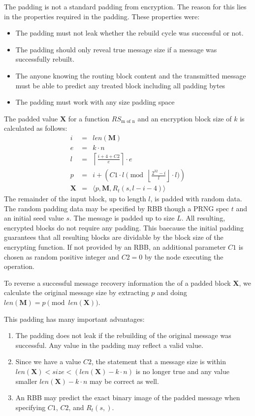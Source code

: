 \documentclass[10pt,journal,compsoc]{IEEEtran}
\begin{document}
The padding is not a standard padding from encryption. The reason for this lies in the properties required in the padding. These properties were:
\begin{itemize}
	\item The padding must not leak whether the rebuild cycle was successful or not.
	\item The padding should only reveal true message size if a message was successfully rebuilt. 
	\item The anyone knowing the routing block content and the transmitted message must be able to predict any treated block including all padding bytes
	\item The padding must work with any size padding space
\end{itemize}

The padded value $\mathbf{X}$ for a function $RS_{\text{m of n}}$ and an encryption block size of $k$ is calculated as follows:
\begin{eqnarray}
	i          & = & len(\mathbf{M})\\
	e          & = & k \cdot n\\
	l          & = & \left\lceil\frac{i + 4 + C2 }{e}\right\rceil\cdot e\\
	p          & = & i + \left( C1 \cdot l \pmod{\left\lfloor\frac{2^{32}-i}{l}\right\rfloor\cdot l}\right)\\
	\mathbf{X} & = & \langle p,\mathbf{M},R_{t}\left(s,l-i-4\right)\rangle
\end{eqnarray}	
The remainder of the input block, up to length $l$, is padded with random data. The random padding data may be specified by RBB though a PRNG spec $t$ and an initial seed value $s$. The message is padded up to size $L$. All resulting, encrypted blocks do not require any padding. This baecause the initial padding guarantees that all resulting blocks are dividable by the block size of the encrypting function. If not provided by an RBB, an additional parameter $C1$ is chosen as random positive integer and $C2=0$  by the node executing the operation.

To reverse a successful message recovery information the of a padded block $\mathbf{X}$, we calculate the original message size by extracting $p$ and doing $len(\mathbf{M})=p \pmod{ len(\mathbf{X})}$.

This padding has many important advantages:
\begin{enumerate}
	\item The padding does not leak if the rebuilding of the original message was successful. Any value in the padding may reflect a valid value.
	\item Since we have a value $C2$, the statement that a message size is within $len(\mathbf{X})<size<(len(\mathbf{X})-k\cdot n)$ is no longer true and any value smaller $len(\mathbf{X})-k\cdot n$ may be correct as well.
	\item An RBB may predict the exact binary image of the padded message when specifying $C1$, $C2$, and $R_{t}(s,)$.
\end{enumerate}
\end{document}
